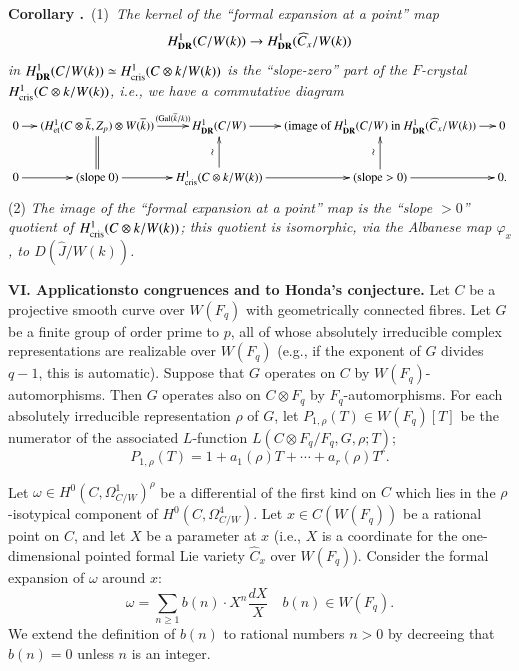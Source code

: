 \medskip
\noindent
{\bf Corollary .\label{art6-coro5.9.6}}~(1)~{\em The kernel of the ``formal expansion at a point'' map}
$$
H^{1}_{\mathbf{DR}}(C/W(k))\to H^{1}_{\mathbf{DR}}(\widehat{C}_{x}/W(k))
$$
{\em in $H^{1}_{\mathbf{DR}}(C/W(k))\simeq H^{1}_{\operatorname{cris}}(C\otimes k/W(k))$ is the ``slope-zero'' part of the $F$-crystal $H^{1}_{\operatorname{cris}}(C\otimes k/W(k))$, i.e., we have a commutative diagram}
{\fontsize{7}{9}\selectfont
\[
\xymatrix@C=.42cm{
0\ar[r] & (H^{1}_{\et}(C\otimes \overline{k},Z_{p})\otimes W(\overline{k}))\ar@{=}[d]\ar[r]^-{(\Gal(\overline{k}/k))} & H^{1}_{\DR}(C/W)\ar[r] & (\text{image of~}H^{1}_{\DR}(C/W)\text{~in~} H^{1}_{\DR}(\widehat{C}_{x}/W(k))\ar[r] & 0\\
0\ar[r] & (\text{slope~}0)\ar[r] & H^{1}_{\cris}(C\otimes k/W(k))\ar[u]^{\rotatebox{90}{$\sim$}}\ar[r] & (\text{slope}>0)\ar[u]^{\rotatebox{90}{$\sim$}}\ar[r] & 0.
}
\]}\relax
(2) {\em The image of the ``formal expansion at a point'' map is the ``slope $>0$'' quotient of $H^{1}_{\operatorname{cris}}(C\otimes k/W(k))$; this quotient is isomorphic, via the Albanese map $\varphi_{x}$, to $D(\widehat{J}/W(k))$.}

\bigskip
\noindent
{\bf VI. Applications\pageoriginale to congruences and to Honda's conjecture.} Let $C$ be a projective smooth curve over $W(F_{q})$ with geometrically connected fibres. Let $G$ be a finite group of order prime to $p$, all of whose absolutely irreducible complex representations are realizable over $W(F_{q})$ (e.g., if the exponent of $G$ divides $q-1$, this is automatic). Suppose that $G$ operates on $C$ by $W(F_{q})$-automorphisms. Then $G$ operates also on $C\otimes F_{q}$ by $F_{q}$-automorphisms. For each absolutely irreducible representation $\rho$ of $G$, let $P_{1,\rho}(T)\in W(F_{q})[T]$ be the numerator of the associated $L$-function $L(C\otimes F_{q}/F_{q},G,\rho;T)$;
$$
P_{1,\rho}(T)=1+a_{1}(\rho)T+\cdots+a_{r}(\rho)T^{r}.
$$ 

Let $\omega\in H^{0}(C,\Omega^{1}_{C/W})^{\rho}$ be a differential of the first kind on $C$ which lies in the $\rho$-isotypical component of $H^{0}(C,\Omega^{4}_{C/W})$. Let $x\in C(W(F_{q}))$ be a rational point on $C$, and let $X$ be a parameter at $x$ (i.e., $X$ is a coordinate for the one-dimensional pointed formal Lie variety $\widehat{C}_{x}$ over $W(F_{q})$). Consider the formal expansion of $\omega$ around $x$:
$$
\omega=\sum\limits_{n\geq 1}b(n)\cdot X^{n}\dfrac{dX}{X}\quad b(n)\in W(F_{q}).
$$
We extend the definition of $b(n)$ to rational numbers $n>0$ by decreeing that $b(n)=0$ unless $n$ is an integer.

